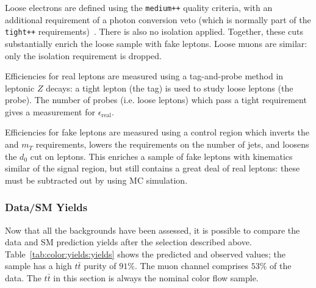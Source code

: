 Loose electrons are defined using the \texttt{medium++} quality criteria, with an additional requirement of a photon conversion veto (which is normally part  of the \texttt{tight++} requirements)~\cite{Aad:2014fxa,ATLAS-CONF-2014-032}. There is also no isolation applied. Together, these cuts substantially enrich the loose sample with fake leptons. Loose muons are similar: only the isolation requirement is dropped.  

Efficiencies for real leptons are measured using a tag-and-probe method in leptonic $Z$ decays: a tight lepton (the tag) is used to study loose leptons (the probe). The number of probes (i.e. loose leptons) which pass a tight requirement gives a measurement for $\epsilon_\mathrm{real}$. 

Efficiencies for fake leptons are measured using a control region which inverts the \met and $m_T$ requirements, lowers the requirements on the number of jets, and loosens the $d_0$ cut on leptons. This enriches a sample of fake leptons with kinematics similar of the signal region, but still contains a great deal of real leptons: these must be subtracted out by using MC simulation.

\subsubsection{Data/SM Yields}

Now that all the backgrounds have been assessed, it is possible to compare the data and SM prediction yields after the selection described above. Table~\ref{tab:color:yields:yields} shows the predicted and observed values; the sample has a high $t\bar{t}$ purity of $91\%$. The muon channel comprises $53\%$ of the data. The $t\bar{t}$ in this section is always the nominal color flow \PowPythia sample.


